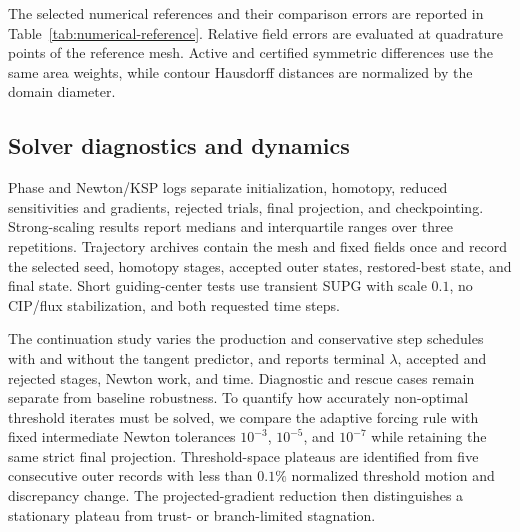 The selected numerical references and their comparison errors are reported in
Table~\ref{tab:numerical-reference}.  Relative field errors are evaluated at
quadrature points of the reference mesh.  Active and certified symmetric
differences use the same area weights, while contour Hausdorff distances are
normalized by the domain diameter.
\begin{table}[tb]
  \centering
  \resizebox{\linewidth}{!}{}
  \caption{Selected numerical references.  A dash denotes an unavailable
  quantity, and pending rows are retained until their MPI cases terminate.}
  \label{tab:numerical-reference}
\end{table}

\subsection{Solver diagnostics and dynamics}
Phase and Newton/KSP logs separate initialization, homotopy, reduced
sensitivities and gradients, rejected trials, final projection, and
checkpointing.  Strong-scaling results report medians and interquartile ranges
over three repetitions.  Trajectory archives contain the mesh and fixed fields
once and record the selected seed, homotopy stages, accepted outer states,
restored-best state, and final state.  Short guiding-center tests use transient
SUPG with scale $0.1$, no CIP/flux stabilization, and both requested time
steps.

The continuation study varies the production and conservative step schedules
with and without the tangent predictor, and reports terminal $\lambda$,
accepted and rejected stages, Newton work, and time.  Diagnostic and rescue
cases remain separate from baseline robustness.  To quantify how accurately
non-optimal threshold iterates must be solved, we compare the adaptive forcing
rule with fixed intermediate Newton tolerances $10^{-3}$, $10^{-5}$, and
$10^{-7}$ while retaining the same strict final projection.
Threshold-space plateaus are identified from five consecutive outer records
with less than $0.1\%$ normalized threshold motion and discrepancy change.
The projected-gradient reduction then distinguishes a stationary plateau from
trust- or branch-limited stagnation.

